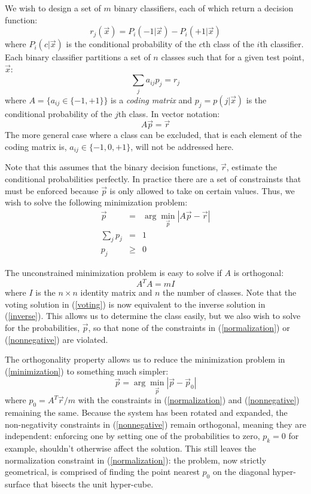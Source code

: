 We wish to design a set of $m$ binary classifiers, each of which return a 
decision function:
\begin{equation}
r_j(\vec x) = P_i(-1 | \vec x) - P_i(+1 | \vec x)
\end{equation}
where $P_i(c | \vec x)$ is the conditional probability of the $c$th class of
the $i$th classifier.
Each binary classifier partitions a set of $n$ classes such that for a
given test point, $\vec x$:
\begin{equation}
\sum_j a_{ij} p_j = r_j
\end{equation}
where $A=\lbrace a_{ij} \in \lbrace -1, +1 \rbrace  \rbrace$ is a {\it coding
matrix} and $p_j = p(j | \vec x)$ is the conditional probability of the $j$th
class.
In vector notation:
\begin{equation}
	A \vec p = \vec r \label{inverse}
\end{equation}
The more general case where a class can be excluded, that is each element of 
the coding matrix is, $a_{ij} \in \lbrace -1, 0, +1\rbrace$, 
will not be addressed here.

Note that this assumes that the binary decision functions, $\vec r$,
estimate the conditional probabilities perfectly.
In practice
there are a set of constrainsts that must be enforced
because $\vec p$ is only allowed to take on certain values.
Thus, we wish to solve the following minimization problem:
\begin{eqnarray}
	\vec p & = & \arg \min_{\vec p} | A \vec p - \vec r | \label{minimization}\\
	\sum_j p_j & = & 1 \label{normalization}\\
	p_j & \ge & 0 \label{nonnegative}
\end{eqnarray}

The unconstrained minimization problem is easy to solve if $A$ is orthogonal:
\begin{equation}
	A^T A = m I
\end{equation}
where $I$ is the $n \times n$ identity matrix and $n$ the number of classes.
Note that the voting solution in (\ref{voting}) is now equivalent to
the inverse solution in (\ref{inverse}).
This allows us to determine the class easily, but we also wish to solve for
the probabilities, $\vec p$, so that none of the constraints in 
(\ref{normalization}) or (\ref{nonnegative}) are violated.

The orthogonality property allows us to reduce the minimization problem 
in (\ref{minimization}) to something much simpler:
\begin{equation}
	\vec p = \arg \min_{\vec p} | \vec p - \vec p_0 |
\end{equation}
where $p_0 = A^T \vec r/m$ with the constraints in (\ref{normalization}) and
(\ref{nonnegative}) remaining the same.
Because the system has been rotated and expanded, the non-negativity 
constraints in (\ref{nonnegative}) remain orthogonal, meaning they are 
independent: enforcing one by setting one of the probabilities to zero, 
$p_k=0$ for example, shouldn't otherwise affect the solution.
This still leaves the normalization constraint in (\ref{normalization}):
the problem, now strictly geometrical, is comprised of finding the point nearest $p_0$ on the diagonal hyper-surface that bisects the unit hyper-cube.


